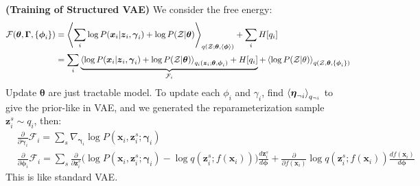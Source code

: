 \begin{remark}{\textbf{(Training of Structured VAE)}}
    We consider the free energy:
    \begin{equation*}
    \begin{aligned}
        \mathcal{F}(\boldsymbol \theta, \boldsymbol \Gamma, \left\{ \boldsymbol \phi_i \right\}) &= \left\langle \sum_i \log P(\boldsymbol x_i | \boldsymbol z_i, \boldsymbol \gamma_i) + \log P(\mathcal{Z}|\boldsymbol \theta) \right\rangle_{q(\mathcal{Z} ; \boldsymbol \theta, \left\langle \boldsymbol \phi \right\rangle)} + \sum_i H[q_i] \\
        &= \sum_i \underbrace{\left\langle \log P(\boldsymbol x_i | \boldsymbol z_i, \boldsymbol \gamma_i) + \log P(\mathcal{Z}|\boldsymbol \theta) \right\rangle_{q_i(\boldsymbol z_i;\boldsymbol \theta, \boldsymbol \phi_i)} + H[q_i]}_{\mathcal{F}_i} + \left\langle \log P(\mathcal{Z}|\theta) \right\rangle_{q(\mathcal{Z}, \boldsymbol \theta, \left\{ \boldsymbol \phi_i \right\})}
    \end{aligned}
    \end{equation*}
    Update $\boldsymbol \theta$ are just tractable model. To update each $\phi_i$ and $\gamma_i$, find $\left\langle \boldsymbol \eta_{\neg i} \right\rangle_{q_{\neg i}}$ to give the prior-like in VAE, and we generated the reparameterization sample $\boldsymbol z^s_i \sim q_i$, then:
    \begin{equation*}
    \begin{aligned}
        &\frac{\partial}{\partial\boldsymbol \gamma_i} \mathcal{F}_i = \sum_s \nabla_{\boldsymbol \gamma_i}\log P(\boldsymbol x_i, \boldsymbol z^s_i; \boldsymbol \gamma_i) \\
        &\frac{\partial}{\partial \boldsymbol \phi_i}\mathcal{F}_i = \sum_{s}\frac{\partial}{\partial \boldsymbol z^s_i}\Big( \log P(\boldsymbol x_i, \boldsymbol z^s_i ; \boldsymbol \gamma_i) - \log q(\boldsymbol z^s_i ; f(\boldsymbol x_i)) \Big)\frac{d\boldsymbol z^s_i}{d\boldsymbol \phi} + \frac{\partial}{\partial f(\boldsymbol x_i)} \log q(\boldsymbol z^s_i ; f(\boldsymbol x_i))\frac{df(\boldsymbol x_i)}{d\boldsymbol \phi}
    \end{aligned}
    \end{equation*}
    This is like standard VAE.
\end{remark}


